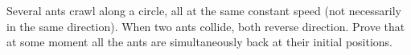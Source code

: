 Several ants crawl along a circle, all at the same constant speed (not necessarily in the same direction). When two ants collide, both reverse direction. Prove that at some moment all the ants are simultaneously back at their initial positions.
